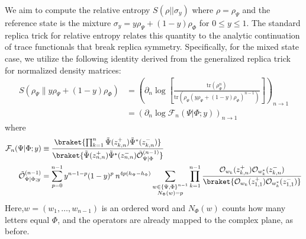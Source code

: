 \documentclass[11pt]{article}
\newcommand{\mO}{\mathcal{O}}
\newcommand{\nn}{\nonumber}
\newcommand{\lb}{\left(}
\newcommand{\rb}{\right)}
\begin{document}
  

We aim to compute the relative entropy $S(\rho || \sigma_{y})$ where $\rho = \rho_{\Psi}$ and the reference state is the mixture $\sigma_{y}= y\rho_{\Psi}+(1-y) \rho_{\Phi}$ for $0\leq y\leq 1$. The standard replica trick for relative entropy relates this quantity to the analytic continuation of trace functionals that break replica symmetry. Specifically, for the mixed state case, we utilize the following identity derived from the generalized replica trick for normalized density matrices:
\begin{align}
    S\left(\rho_\Psi \Big\| y\rho_\Psi+(1-y)\rho_\Phi\right)&=\lb \partial_{n}
    \log \left[ \frac{\text{tr}(\rho_{\Psi}^{n})}{\text{tr}(\rho_{\Psi}(y\rho_{\Psi}+(1-y)\rho_{\Phi})^{n-1})}
    \right]\rb_{n\to 1}\nn\\
    &=\lb \partial_n\log\mathcal{F}_n(\Psi|\Phi;y)\rb_{n\to 1}
\end{align}
where
\begin{align}
    \mathcal{F}_n(\Psi|\Phi;y)&\equiv 
    \frac{\braket{\prod_{k=1}^{n} \tilde\Psi(z^+_{k,n})\tilde\Psi^*(z^-_{k,n})}}{\braket{\tilde\Psi(z^+_{n,n})\tilde\Psi^*(z^-_{n,n})\tilde{\mO}^{(n-1)}_{\Psi|\Phi}}}\nn\\
    \tilde{\mO}_{\Psi|\Phi;y}^{(n-1)}&=\sum_{p=0}^{n-1}y^{n-1-p}(1-y)^p\: n^{4p(h_\Psi-h_\Phi)}
    \sum_{\substack{w\in\{\Psi,\Phi\}^{n-1}\\ N_\Phi(w)=p}} \prod_{k=1}^{n-1}\frac{\mO_{w_k}(z_{k,n}^{+})\mO_{w_k^*}(z_{k,n}^{-})}{\braket{\mO_{w_k}(z^+_{1,1})\mO_{w_k^*}(z^-_{1,1})}}
  \end{align} 
   Here,$w=(w_{1},\dots,w_{n-1})$ is an ordered word and $N_{\Phi}(w)$ counts how many letters equal $\Phi$, and the operators are already mapped to the complex plane, as before. 
\end{document}
